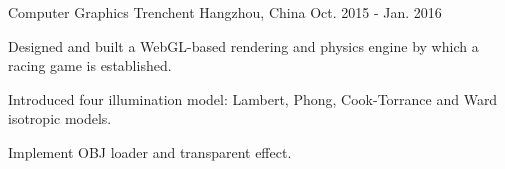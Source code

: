 \cventry
{Computer Graphics} %
{Trenchent} %
{Hangzhou, China} %
{Oct. 2015 - Jan. 2016} %
{ %
\begin{cvitems}
    \item {Designed and built a WebGL-based rendering and physics engine by which a racing game is established.}
    \item {Introduced four illumination model: Lambert, Phong, Cook-Torrance and Ward isotropic models.}
    \item {Implement OBJ loader and transparent effect.}
\end{cvitems}
}